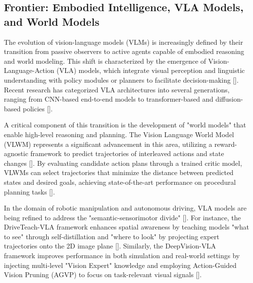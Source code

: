 \documentclass[11pt]{article}
\begin{document}
\subsection{Frontier: Embodied Intelligence, VLA Models, and World Models}

The evolution of vision-language models (VLMs) is increasingly defined by their transition from passive observers to active agents capable of embodied reasoning and world modeling. This shift is characterized by the emergence of Vision-Language-Action (VLA) models, which integrate visual perception and linguistic understanding with policy modules or planners to facilitate decision-making [\citep{2505.04769}]. Recent research has categorized VLA architectures into several generations, ranging from CNN-based end-to-end models to transformer-based and diffusion-based policies [\citep{2510.07077}].

A critical component of this transition is the development of "world models" that enable high-level reasoning and planning. The Vision Language World Model (VLWM) represents a significant advancement in this area, utilizing a reward-agnostic framework to predict trajectories of interleaved actions and state changes [\citep{2509.02722}]. By evaluating candidate action plans through a trained critic model, VLWMs can select trajectories that minimize the distance between predicted states and desired goals, achieving state-of-the-art performance on procedural planning tasks [\citep{2509.02722}].

In the domain of robotic manipulation and autonomous driving, VLA models are being refined to address the "semantic-sensorimotor divide" [\citep{2509.11766}]. For instance, the DriveTeach-VLA framework enhances spatial awareness by teaching models "what to see" through self-distillation and "where to look" by projecting expert trajectories onto the 2D image plane [\citep{2607.01658}]. Similarly, the DeepVision-VLA framework improves performance in both simulation and real-world settings by injecting multi-level "Vision Expert" knowledge and employing Action-Guided Vision Pruning (AGVP) to focus on task-relevant visual signals [\citep{2603.15618}].
\end{document}
